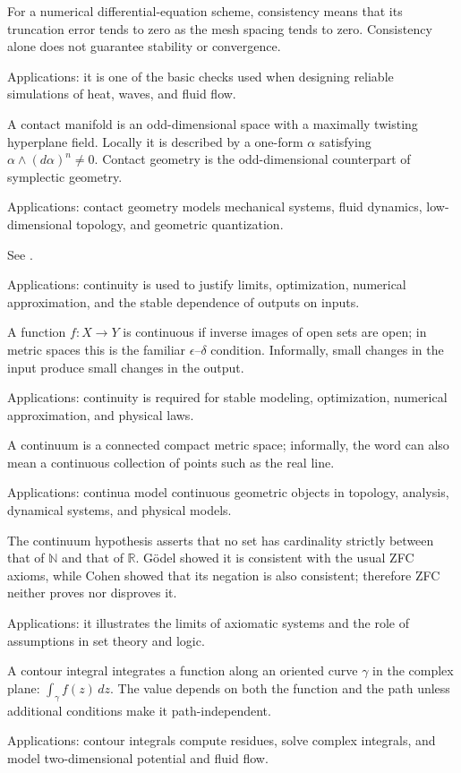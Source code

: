 For a numerical differential-equation scheme, consistency means that its truncation error tends to zero as the mesh spacing tends to zero. Consistency alone does not guarantee stability or convergence. \par\noindent Applications: it is one of the basic checks used when designing reliable simulations of heat, waves, and fluid flow.

A contact manifold is an odd-dimensional space with a maximally twisting hyperplane field. Locally it is described by a one-form $\alpha$ satisfying $\alpha\wedge(d\alpha)^n\ne0$. Contact geometry is the odd-dimensional counterpart of symplectic geometry. \par\noindent Applications: contact geometry models mechanical systems, fluid dynamics, low-dimensional topology, and geometric quantization.

See . \par\noindent Applications: continuity is used to justify limits, optimization, numerical approximation, and the stable dependence of outputs on inputs.

A function $f:X\to Y$ is continuous if inverse images of open sets are open; in metric spaces this is the familiar $\epsilon$--$\delta$ condition. Informally, small changes in the input produce small changes in the output. \par\noindent Applications: continuity is required for stable modeling, optimization, numerical approximation, and physical laws.

A continuum is a connected compact metric space; informally, the word can also mean a continuous collection of points such as the real line. \par\noindent Applications: continua model continuous geometric objects in topology, analysis, dynamical systems, and physical models.

The continuum hypothesis asserts that no set has cardinality strictly between that of $\mathbb N$ and that of $\mathbb R$. Gödel showed it is consistent with the usual ZFC axioms, while Cohen showed that its negation is also consistent; therefore ZFC neither proves nor disproves it. \par\noindent Applications: it illustrates the limits of axiomatic systems and the role of assumptions in set theory and logic.

A contour integral integrates a function along an oriented curve $\gamma$ in the complex plane: $\int_\gamma f(z)\,dz$. The value depends on both the function and the path unless additional conditions make it path-independent. \par\noindent Applications: contour integrals compute residues, solve complex integrals, and model two-dimensional potential and fluid flow.

